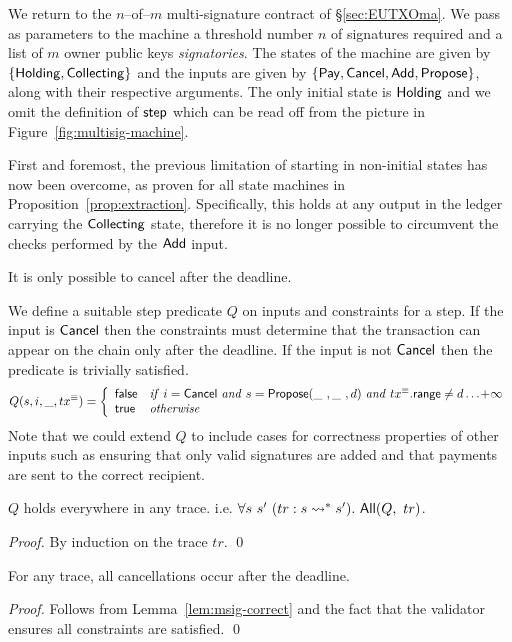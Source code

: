 \begin{example}
We return to the $n$--of--$m$ multi-signature contract of
\S\ref{sec:EUTXOma}. We pass as parameters to the machine a
threshold number $n$ of signatures required and a list of $m$ owner
public keys \textit{signatories}. The states of the machine are given by
$\{\mathsf{Holding}, \mathsf{Collecting}\}$ and the
inputs are given by $\{\mathsf{Pay}, \mathsf{Cancel}, \mathsf{Add}, \mathsf{Propose}\}$,
along with their respective arguments.
The only initial state is $\mathsf{Holding}$ and we omit the definition of
$\mathsf{step}$ which can be read off from the picture in
Figure~\ref{fig:multisig-machine}.

First and foremost, the previous limitation of starting in non-initial
states has now been overcome, as proven for all state machines in
Proposition~\ref{prop:extraction}.
Specifically, this holds at any output in the ledger carrying the
$\mathsf{Collecting}$ state,
therefore it is no longer possible to circumvent the checks performed
by the $\mathsf{Add}$ input.

\end{example}
\begin{property}
It is only possible to cancel after the deadline.
\end{property}
%
We define a suitable step predicate $Q$ on inputs and constraints for a step. If the input is
$\mathsf{Cancel}$ then the constraints must determine that the
transaction can appear on the chain only after the deadline. If the
input is not $\mathsf{Cancel}$ then the predicate is trivially
satisfied.
\begin{displaymath}
Q(s,i,\_,\txeq) = \left\{
  \begin{array}{ll}
  \false & \mi{if}  \ i = \Cancel \ \mi{and}\ s = \Propose{\_\ }{\_\ }{d} \ \mi{and}\ \txeq.\s{range} \neq d\dots\!+\!\infty \\
  \true  & \mi{otherwise}
  \end{array}
\right.
\end{displaymath}
%
Note that we could extend $Q$ to include cases for correctness
properties of other inputs such as ensuring that only valid signatures
are added and that payments are sent to the correct recipient.
\begin{lemma}
\label{lem:msig-correct}
$Q$ holds everywhere in any trace. i.e. $\forall s\ s'\ (tr : s  \rightsquigarrow^*  s').\ \mathsf{All}(Q,\ tr)$.
\end{lemma}
\begin{proof}
  By induction on the trace $tr$.
  \qed
\end{proof}
\begin{proposition}
  For any trace, all cancellations occur after the deadline.
\end{proposition}
\begin{proof}
  Follows from Lemma~\ref{lem:msig-correct} and the fact that the validator ensures all constraints are satisfied.
  \qed
\end{proof}

